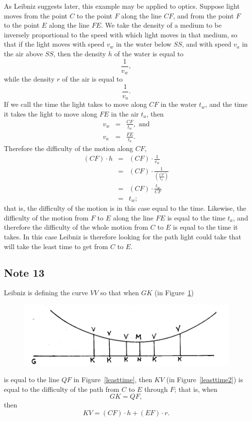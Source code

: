 \documentclass[twoside,openright]{article}
\newlength{\oldjot}
\begin{document}
As Leibniz suggests later, this example may be applied to optics.
Suppose light moves from the point $C$ to the point $F$ along the line
$CF$, and from the point $F$ to the point $E$ along the line $FE$.  We
take the density of a medium to be inversely proportional to the speed
with which light moves in that medium, so that if the light moves with
speed $v_w$ in the water below $SS$, and with speed $v_a$ in the air
above $SS$, then the density $h$ of the water is equal to
$$\frac{1}{v_w},$$
while the density $r$ of the air is equal to 
$$\frac{1}{v_a}.$$
If we call the time the light takes to move along $CF$ in the water
$t_w$, and the time it takes the light to move along $FE$ in the air
$t_a$, then
\begin{eqnarray*}
v_w & = & \frac{CF}{t_w}, \mbox{ and}\\
v_a & = & \frac{FE}{t_a}.
\end{eqnarray*}
Therefore the difficulty of the motion along $CF$, 
\setlength{\jot}{2ex}
\begin{eqnarray*}
(CF)\cdot h &  =  & (CF) \cdot \frac{1}{v_w}\\
& = & (CF) \cdot \frac{1}{\left(\frac{CF}{t_w}\right)}\\
& = & (CF) \cdot \frac{t_w}{CF} \\
& = & t_w;
\end{eqnarray*}
that is, the difficulty of the motion is in this case equal to the
time.  Likewise, the difficulty of the motion from $F$ to $E$ along
the line $FE$ is equal to the time $t_a$, and therefore the difficulty
of the whole motion from $C$ to $E$ is equal to the time it takes.  In
this case Leibniz is therefore looking for the path light could take
that will take the least time to get from $C$ to $E$.
\setlength{\jot}{\oldjot}

\subsection*{Note 13}
\label{cnm13}

Leibniz is defining the curve $VV$ so that when $GK$ (in Figure~\ref{leasttime2A})
\begin{figure}[htp]
\begin{center}
\includegraphics[width=.95\textwidth]{fig/Figure22}
\caption{}
\label{leasttime2A}
\vspace{-10pt}
\end{center}
\end{figure}
is equal to the line $QF$ in Figure~\ref{leasttime}, then $KV$ (in
Figure~\ref{leasttime2}) is equal to the difficulty of the path from
$C$ to $E$ through $F$; that is, when
$$GK = QF,$$
then 
$$KV =  (CF)\cdot h + (EF)\cdot r.$$
\end{document}
